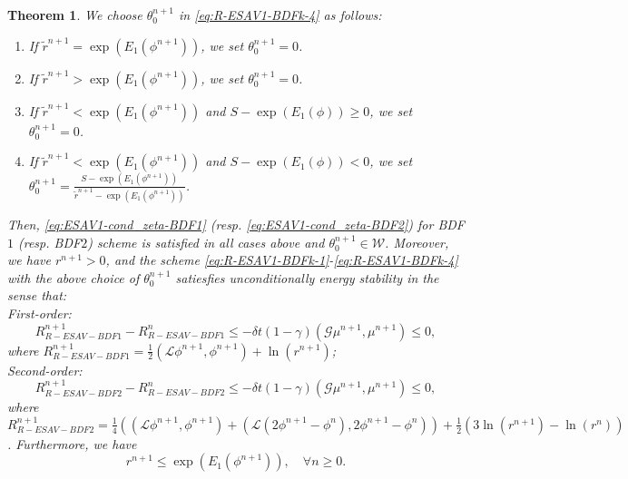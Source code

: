 \documentclass[final,review,onefignum,onetabnum]{siamart190516}
\theoremstyle{plain}
\newtheorem{thm}{Theorem}[section]
\begin{document}
\begin{thm}\label{Th:ESAV1-stability}
We choose $\theta_{0}^{n+1}$ in \eqref{eq:R-ESAV1-BDFk-4} as follows:
\begin{enumerate}
\item If $\tilde{r}^{n+1} = \exp\left(E_{1}\left(\phi^{n+1}\right)\right)$, we set $\theta_{0}^{n+1}=0$.
\item If $\tilde{r}^{n+1} > \exp\left(E_{1}\left(\phi^{n+1}\right)\right)$, we set $\theta_{0}^{n+1}=0$. 
\item If $\tilde{r}^{n+1} < \exp\left(E_{1}\left(\phi^{n+1}\right)\right)$ and $S-\exp\left(E_{1}(\phi)\right) \geq 0$, we set $\theta_{0}^{n+1}=0$.  
\item If $\tilde{r}^{n+1} < \exp\left(E_{1}\left(\phi^{n+1}\right)\right)$ and $S-\exp\left(E_{1}(\phi)\right) < 0$, we set $\theta_{0}^{n+1}=\frac{S-\exp\left(E_{1}(\phi^{n+1})\right)}{\tilde{r}^{n+1}-\exp\left(E_{1}(\phi^{n+1})\right)}$.
	\end{enumerate}
Then, \eqref{eq:ESAV1-cond_zeta-BDF1} (resp. \eqref{eq:ESAV1-cond_zeta-BDF2}) for BDF$1$ (resp. BDF$2$) scheme is satisfied in all cases above and  $\theta_0^{n+1}\in \mathcal{W}$.
Moreover, we have $r^{n+1}>0$, and the scheme \eqref{eq:R-ESAV1-BDFk-1}-\eqref{eq:R-ESAV1-BDFk-4} with the above choice of  $\theta_0^{n+1}$ satiesfies unconditionally energy stability in the sense that:\\
First-order:
\begin{equation}\label{eq:ESAV1-stability-BDF1}
	R_{R-ESAV-BDF1}^{n+1} - R_{R-ESAV-BDF1}^{n} \leq -\delta t (1-\gamma) \left(\mathcal{G} \mu^{n+1}, \mu^{n+1}\right) \leq 0,
\end{equation}
where $R_{R-ESAV-BDF1}^{n+1}=\frac{1}{2}\left(\mathcal{L} \phi^{n+1}, \phi^{n+1}\right) +\ln(r^{n+1})$;\\
Second-order:
\begin{equation}\label{eq:ESAV1-stability-BDF2}
	R_{R-ESAV-BDF2}^{n+1} - R_{R-ESAV-BDF2}^{n} \leq -\delta t (1-\gamma) \left(\mathcal{G} \mu^{n+1}, \mu^{n+1}\right)\leq 0,
\end{equation}
where 
$R_{R-ESAV-BDF2}^{n+1}=\frac{1}{4}\left(\left(\mathcal{L} \phi^{n+1}, \phi^{n+1}\right) + \left(\mathcal{L}\left(2\phi^{n+1}-\phi^{n}\right), 2\phi^{n+1}-\phi^{n}\right)\right)+\frac{1}{2}\left(3\ln(r^{n+1})-\ln(r^{n})\right)$.
Furthermore, we have 
\begin{equation}
	r^{n+1}\le \exp\left(E_{1}(\phi^{n+1})\right), \quad\forall n\ge 0.
\end{equation}
\end{thm}
\end{document}
